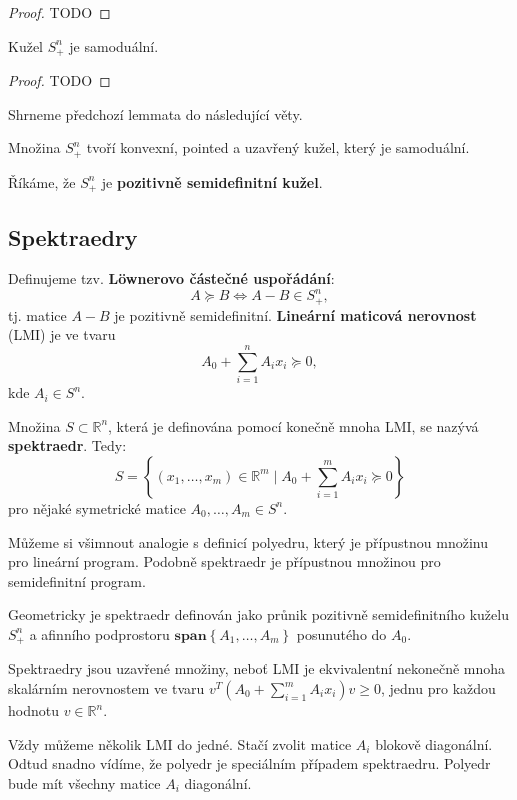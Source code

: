 \begin{proof}
    TODO
\end{proof}

\begin{lm}
    Kužel $S_+^n$ je samoduální.
\end{lm}

\begin{proof}
    TODO
\end{proof}

\noindent Shrneme předchozí lemmata do následující věty.

\begin{vt}
    Množina $S_+^n$ tvoří konvexní, pointed a uzavřený kužel, který je samoduální.
\end{vt}

Říkáme, že $S_+^n$ je \textbf{pozitivně semidefinitní kužel}.

\subsection*{Spektraedry}

Definujeme tzv. \textbf{L\"{o}wnerovo částečné uspořádání}:
$$
    A \succeq B \iff A - B \in S_+^n,
$$
tj. matice $A - B$ je pozitivně semidefinitní. \textbf{Lineární maticová nerovnost} (LMI) je ve tvaru
$$
    A_0 + \sum_{i=1}^n A_i x_i \succeq 0,
$$
kde $A_i \in S^n$.

Množina $S \subset \mathbb{R}^n$, která je definována pomocí konečně mnoha LMI, se nazývá \textbf{spektraedr}. Tedy:
$$
    S = \left\{ (x_1, \dots, x_m) \in \mathbb{R}^m \mid A_0 + \sum_{i=1}^m A_i x_i \succeq 0 \right\}
$$
pro nějaké symetrické matice $A_0, \dots, A_m \in S^n$.

Můžeme si všimnout analogie s definicí polyedru, který je přípustnou množinu pro lineární program. Podobně spektraedr je přípustnou množinou pro semidefinitní program.

Geometricky je spektraedr definován jako průnik pozitivně semidefinitního kuželu $S_+^n$ a afinního podprostoru $\textbf{span}\left\{ A_1, \dots, A_m \right\}$ posunutého do $A_0$.

Spektraedry jsou uzavřené množiny, neboť LMI je ekvivalentní nekonečně mnoha skalárním nerovnostem ve tvaru $v^T(A_0 + \sum_{i=1}^m A_ix_i)v \geq 0$, jednu pro každou hodnotu $v \in \mathbb{R}^n$.

Vždy můžeme několik LMI  do jedné. Stačí zvolit matice $A_i$ blokově diagonální. Odtud snadno vídíme, že polyedr je speciálním případem spektraedru. Polyedr bude mít všechny matice $A_i$ diagonální.

